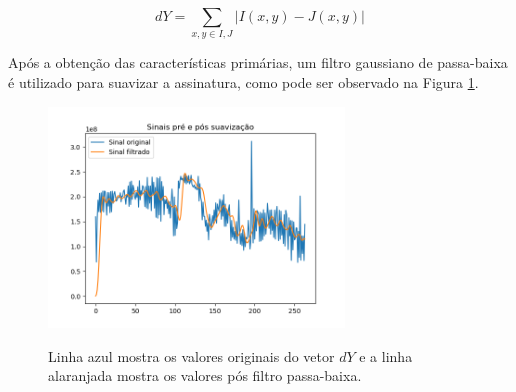 \begin{equation}
	\label{eq:framediff}
	dY = \sum_{x,y \in  I,J} |I(x,y) - J(x,y)|
\end{equation} 

   Após a obtenção das características primárias, um filtro gaussiano de passa-baixa é utilizado para suavizar a assinatura, como pode ser observado na Figura \ref{fig:framediff-passa-baixa}. %




\begin{figure}[h]
\centering
	\caption{Linha azul mostra os valores originais do vetor $dY$ e a linha alaranjada mostra os valores pós filtro passa-baixa.}
  	\includegraphics[width=0.7\textwidth]{dados/figuras/filtro_passa_baixa}
  \label{fig:framediff-passa-baixa}
\end{figure}


